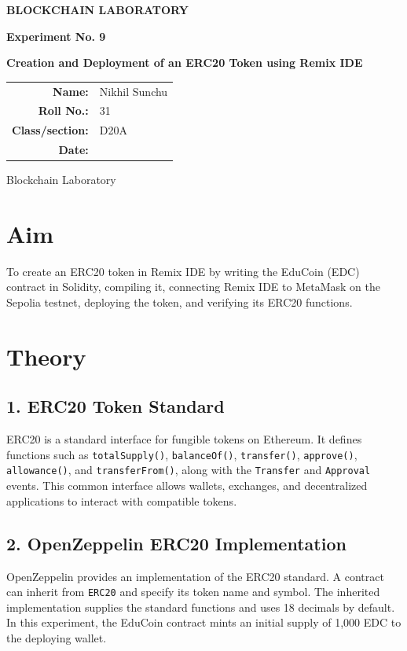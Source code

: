 \documentclass[12pt,a4paper]{article}
\begin{document}
\sloppy
\begin{titlepage}
\centering
\vspace*{1.5cm}
{\Large\bfseries BLOCKCHAIN LABORATORY\par}
\vspace{1.2cm}
{\large\bfseries Experiment No. 9\par}
\vspace{0.8cm}
{\LARGE\bfseries Creation and Deployment of an ERC20 Token using Remix IDE\par}
\vspace{1.5cm}
\begin{tabular}{rl}
\textbf{Name:} & Nikhil Sunchu \\[0.6cm]
\textbf{Roll No.:} & 31 \\[0.6cm]
\textbf{Class/section:} & D20A \\[0.6cm]
\textbf{Date:} \\[0.6cm]
\end{tabular}
\vfill
{\large Blockchain Laboratory\par}
\end{titlepage}

\section{Aim}
To create an ERC20 token in Remix IDE by writing the EduCoin (EDC) contract in Solidity, compiling it, connecting Remix IDE to MetaMask on the Sepolia testnet, deploying the token, and verifying its ERC20 functions.

\section{Theory}
\subsection{1. ERC20 Token Standard}
ERC20 is a standard interface for fungible tokens on Ethereum. It defines functions such as \texttt{totalSupply()}, \texttt{balanceOf()}, \texttt{transfer()}, \texttt{approve()}, \texttt{allowance()}, and \texttt{transferFrom()}, along with the \texttt{Transfer} and \texttt{Approval} events. This common interface allows wallets, exchanges, and decentralized applications to interact with compatible tokens.

\subsection{2. OpenZeppelin ERC20 Implementation}
OpenZeppelin provides an implementation of the ERC20 standard. A contract can inherit from \texttt{ERC20} and specify its token name and symbol. The inherited implementation supplies the standard functions and uses 18 decimals by default. In this experiment, the EduCoin contract mints an initial supply of 1,000 EDC to the deploying wallet.
\end{document}
